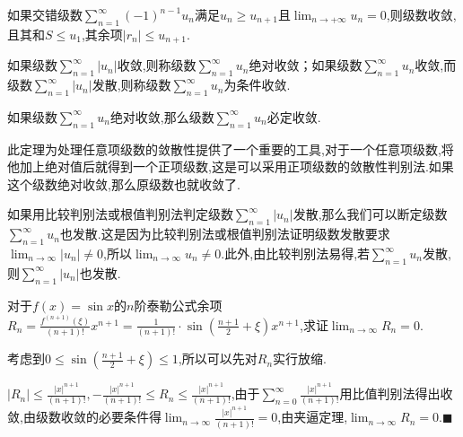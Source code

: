\begin{ttheorem}[（Leibniz定理）]
    如果交错级数$\sum^{\infty}_{n=1} (-1)^{n-1}u_n$满足$u_n \geqslant u_{n+1}$且$\lim_{n \to +\infty} u_n=0$,则级数收敛,且其和$S \leqslant u_1$,其余项$\left\lvert r_n\right\rvert \leqslant u_{n+1}$.
\end{ttheorem}
\begin{definition}[]
    如果级数$\sum^{\infty}_{n=1} \left\lvert u_n\right\rvert $收敛,则称级数$\sum^{\infty}_{n=1} u_n$绝对收敛；如果级数$\sum^{\infty}_{n=1} u_n$收敛,而级数$\sum^{\infty}_{n=1} \left\lvert u_n\right\rvert $发散,则称级数$\sum^{\infty}_{n=1} u_n$为条件收敛.
\end{definition}
\begin{ttheorem}[]
    如果级数$\sum^{\infty}_{n=1} u_n$绝对收敛,那么级数$\sum^{\infty}_{n=1} u_n$必定收敛.
\end{ttheorem}
此定理为处理任意项级数的敛散性提供了一个重要的工具,对于一个任意项级数,将他加上绝对值后就得到一个正项级数,这是可以采用正项级数的敛散性判别法.如果这个级数绝对收敛,那么原级数也就收敛了.

如果用比较判别法或根值判别法判定级数$\sum^{\infty}_{n=1} \left\lvert u_n\right\rvert $发散,那么我们可以断定级数$\sum^{\infty}_{n=1} u_n$也发散.这是因为比较判别法或根值判别法证明级数发散要求$\lim_{n \to \infty} \left\lvert u_n\right\rvert  \neq 0$,所以$\lim_{n \to \infty} u_n \neq 0$.此外,由比较判别法易得,若$\sum^{\infty}_{n=1} u_n$发散,则$\sum^{\infty}_{n=1} \left\lvert u_n\right\rvert $也发散.

\begin{examp}{对于$f(x)=\sin x$的$n$阶泰勒公式余项$R_n=\frac{f^{(n+1)}(\xi)}{(n+1)!}x^{n+1}=\frac{1}{(n+1)!}\cdot \sin \left( \frac{n+1}{2}+\xi \right)x^{n+1}$,求证$\lim_{n \to \infty} R_n=0$.}
    \par \zheng 考虑到$0\leqslant \sin \left( \frac{n+1}{2}+\xi \right) \leqslant 1$,所以可以先对$R_n$实行放缩.

    $\left\lvert R_n\right\rvert  \leqslant \frac{\left\lvert x\right\rvert ^{n+1}}{(n+1)!},-\frac{\left\lvert x\right\rvert ^{n+1}}{(n+1)!}\leqslant R_n \leqslant \frac{\left\lvert x\right\rvert ^{n+1}}{(n+1)!}$,由于$\sum_{n=0}^{\infty} \frac{\left\lvert x\right\rvert ^{n+1}}{(n+1)!}$用比值判别法得出收敛,由级数收敛的必要条件得$\lim_{n \to \infty} \frac{\left\lvert x\right\rvert ^{n+1}}{(n+1)!}=0$,由夹逼定理,$\lim_{n \to \infty} R_n=0$.\hfill $\blacksquare $
\end{examp}

